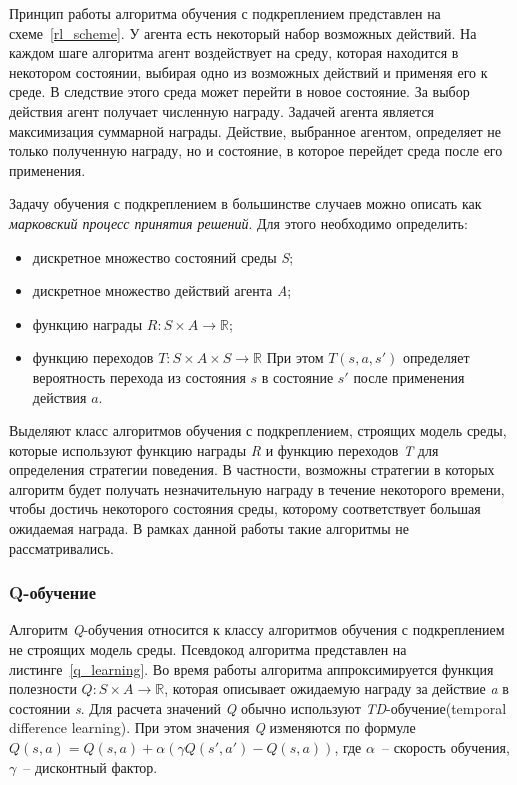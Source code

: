 Принцип работы алгоритма обучения с подкреплением представлен на схеме~\ref{rl_scheme}. У агента есть некоторый набор возможных действий. На каждом шаге алгоритма агент воздействует на среду, которая находится в некотором состоянии, выбирая одно из возможных действий и применяя его к среде. В следствие этого среда может перейти в новое состояние. За выбор действия агент получает численную награду. Задачей агента является максимизация суммарной награды. Действие, выбранное агентом, определяет не только полученную награду, но и состояние, в которое перейдет среда после его применения.

Задачу обучения с подкреплением в большинстве случаев можно описать как \textit{марковский процесс принятия решений}. Для этого необходимо определить:

\begin{itemize}
    \item дискретное множество состояний среды \textit{S};
    \item дискретное множество действий агента \textit{A};
    \item функцию награды $R : S \times A \rightarrow \mathbb{R}$;
    \item функцию переходов $T : S \times A \times S \rightarrow \mathbb{R}$ При этом $T(s, a, s')$ определяет вероятность перехода из состояния $s$ в состояние $s'$ после применения действия $a$.
\end{itemize}

Выделяют класс алгоритмов обучения с подкреплением, строящих модель среды, которые используют функцию награды \textit{R} и функцию переходов \textit{T} для определения стратегии поведения. В частности, возможны стратегии в которых алгоритм будет получать незначительную награду в течение некоторого времени, чтобы достичь некоторого состояния среды, которому соответствует большая ожидаемая награда. В рамках данной работы такие алгоритмы не рассматривались.

\subsubsection{Q-обучение}

Алгоритм \textit{Q}-обучения относится к классу алгоритмов обучения с подкреплением не строящих модель среды. Псевдокод алгоритма представлен на листинге~\ref{q_learning}. Во время работы алгоритма аппроксимируется функция полезности $Q : S \times A \rightarrow \mathbb{R}$, которая описывает ожидаемую награду за действие \textit{a} в состоянии \textit{s}. Для расчета значений \textit{Q} обычно используют \textit{TD}-обучение(temporal difference learning). При этом значения \textit{Q} изменяются по формуле $Q(s, a) = Q(s, a) + \alpha (\gamma Q(s', a') - Q(s, a))$, где $\alpha$~-- скорость обучения, $\gamma$~-- дисконтный фактор.

